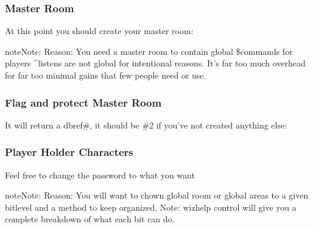 \documentclass[letterpaper,10pt,english]{sphinxmanual}
\begin{document}
\begin{sphinxVerbatim}[commandchars=\\\{\}]
 
\end{sphinxVerbatim}


\subsubsection{Master Room}
\label{\detokenize{gettingstarted:master-room}}
\sphinxAtStartPar
At this point you should create your master room:

\begin{sphinxVerbatim}[commandchars=\\\{\}]
  
\end{sphinxVerbatim}

\begin{sphinxadmonition}{note}{Note:}
\sphinxAtStartPar
Reason: You need a master room to contain global \$commands for players
\textasciicircum{}listens are not global for intentional reasons.  It’s far too much overhead for far too minimal gains that few people need or use.
\end{sphinxadmonition}


\subsubsection{Flag and protect Master Room}
\label{\detokenize{gettingstarted:flag-and-protect-master-room}}
\sphinxAtStartPar
It will return a dbref\#, it should be \#2 if you’ve not created anything else:

\begin{sphinxVerbatim}[commandchars=\\\{\}]
 
\end{sphinxVerbatim}


\subsubsection{Player Holder Characters}
\label{\detokenize{gettingstarted:player-holder-characters}}
\sphinxAtStartPar
Feel free to change the password to what you want

\begin{sphinxadmonition}{note}{Note:}
\sphinxAtStartPar
Reason: You will want to chown global room or global areas to a given bitlevel and a method to keep organized.
Note: wizhelp control will give you a complete breakdown of what each bit can do.
\end{sphinxadmonition}
\end{document}
